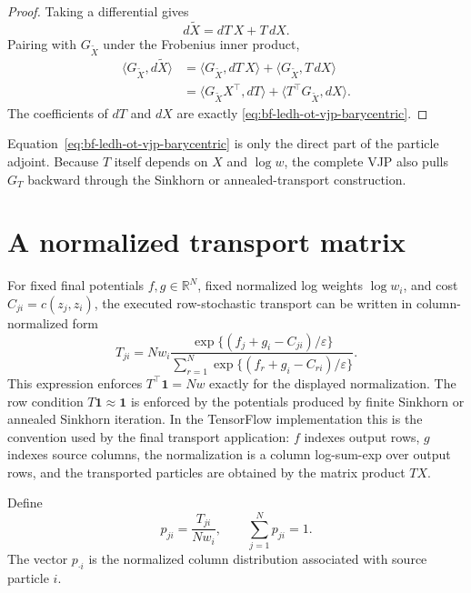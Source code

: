 \begin{proof}
Taking a differential gives
\[
  d\widetilde X = dT\,X + T\,dX .
\]
Pairing with \(G_{\widetilde X}\) under the Frobenius inner product,
\begin{align*}
  \langle G_{\widetilde X},d\widetilde X\rangle
  &=
  \langle G_{\widetilde X},dT\,X\rangle
  +
  \langle G_{\widetilde X},T\,dX\rangle  \\
  &=
  \langle G_{\widetilde X}X^\top,dT\rangle
  +
  \langle T^\top G_{\widetilde X},dX\rangle .
\end{align*}
The coefficients of \(dT\) and \(dX\) are exactly
\eqref{eq:bf-ledh-ot-vjp-barycentric}.
\end{proof}

Equation~\eqref{eq:bf-ledh-ot-vjp-barycentric} is only the direct part of the
particle adjoint.  Because \(T\) itself depends on \(X\) and \(\log w\), the
complete VJP also pulls \(G_T\) backward through the Sinkhorn or
annealed-transport construction.

\section{A normalized transport matrix}
\label{sec:bf-ledh-ot-normalized-transport}

For fixed final potentials \(f,g\in\mathbb R^N\), fixed normalized log weights
\(\log w_i\), and cost \(C_{ji}=c(z_j,z_i)\), the executed row-stochastic
transport can be written in column-normalized form
\begin{equation}
\label{eq:bf-ledh-ot-transport-form}
  T_{ji}
  =
  N w_i
  \frac{
    \exp\{(f_j+g_i-C_{ji})/\varepsilon\}
  }{
    \sum_{r=1}^N
    \exp\{(f_r+g_i-C_{ri})/\varepsilon\}
  } .
\end{equation}
This expression enforces \(T^\top\mathbf 1=Nw\) exactly for the displayed
normalization.  The row condition \(T\mathbf 1\approx\mathbf 1\) is enforced by
the potentials produced by finite Sinkhorn or annealed Sinkhorn iteration.
In the TensorFlow implementation this is the convention used by the final
transport application: \(f\) indexes output rows, \(g\) indexes source columns,
the normalization is a column log-sum-exp over output rows, and the transported
particles are obtained by the matrix product \(T X\).

Define
\begin{equation}
\label{eq:bf-ledh-ot-column-prob}
  p_{ji}
  =
  \frac{T_{ji}}{Nw_i},
  \qquad
  \sum_{j=1}^N p_{ji}=1.
\end{equation}
The vector \(p_{\cdot i}\) is the normalized column distribution associated with
source particle \(i\).

